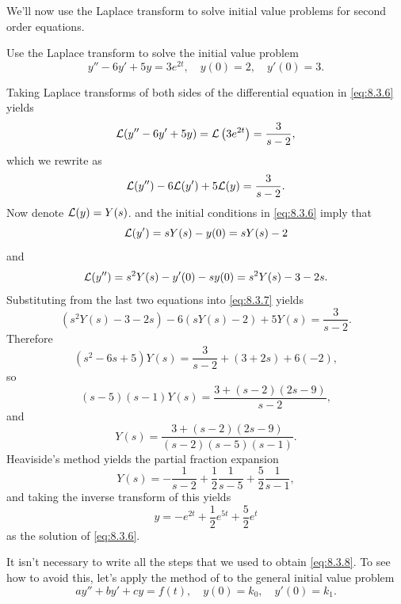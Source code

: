 
We'll now use the Laplace transform to solve initial value problems
for  second order equations.

\begin{example}\label{example:8.3.2}
Use the Laplace transform to solve the initial value problem
\begin{equation}\label{eq:8.3.6}
y''-6y'+5y=3e^{2t},\quad y(0)=2, \quad   y'(0)=3.
\end{equation}
\end{example}

\begin{solution}
Taking Laplace transforms of both sides of the differential equation
in \eqref{eq:8.3.6} yields
\[
{\mathcal L}(y''-6y'+5y)={\mathcal L}\left(3e^{2t}\right)=\frac{3}{s-2},
\]
which we rewrite as
\begin{equation}\label{eq:8.3.7}
{\mathcal L}(y'')-6{\mathcal L}(y')+5{\mathcal L}(y)=\frac{3}{s-2}.
\end{equation}
Now denote ${\mathcal L}(y)=Y(s)$.  and the
initial conditions in \eqref{eq:8.3.6} imply that
\[
{\mathcal L}(y')=sY(s)-y(0)=sY(s)-2
\]
and
\[
{\mathcal L}(y'')=s^2Y(s)-y'(0)-sy(0)=s^2Y(s)-3-2s.
\]
Substituting from the last two equations into  \eqref{eq:8.3.7} yields
\[
\left(s^2Y(s)-3-2s\right)-6\left(sY(s)-2\right)+5Y(s)=\frac{3}{s-2}.
\]
Therefore
\begin{equation}\label{eq:8.3.8}
(s^2-6s+5)Y(s)=\frac{3}{s-2}+(3+2s)+6(-2),
\end{equation}
so
\[
(s-5)(s-1)Y(s)=\frac{3+(s-2)(2s-9)}{s-2},
\]
and
\[
Y(s)=\frac{3+(s-2)(2s-9)}{(s-2)(s-5)(s-1)}.
\]
Heaviside's method yields the partial fraction expansion
\[
Y(s)=-\frac{1}{s-2}+\frac{1}{2}\frac{1}{s-5}+\frac{5}{2}\frac{1}{s-1},
\]
and taking the inverse transform of this yields
\[
y=-e^{2t}+\frac{1}{2}e^{5t}+\frac{5}{2}e^t
\]
as the solution of  \eqref{eq:8.3.6}.
\end{solution}

It isn't necessary to write all the steps that we used to obtain
\eqref{eq:8.3.8}. To see how to avoid this, let's apply the method of
 to the general initial value problem
\begin{equation}\label{eq:8.3.9}
ay''+by'+cy=f(t), \quad  y(0)=k_0,\quad y'(0)=k_1.
\end{equation}

